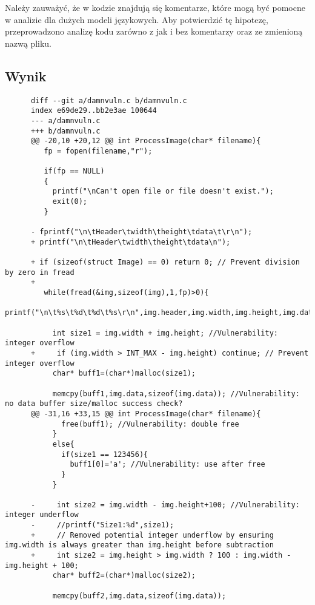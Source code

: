 Należy zauważyć, że w kodzie znajdują się komentarze, które mogą być pomocne w analizie dla dużych modeli językowych. 
Aby potwierdzić tę hipotezę, przeprowadzono analizę kodu zarówno z jak i bez komentarzy oraz ze zmienioną nazwą pliku.

\subsection{Wynik}
\begin{listing}[H]
    \begin{verbatim}
      diff --git a/damnvuln.c b/damnvuln.c
      index e69de29..bb2e3ae 100644
      --- a/damnvuln.c
      +++ b/damnvuln.c
      @@ -20,10 +20,12 @@ int ProcessImage(char* filename){
         fp = fopen(filename,"r"); 
       
         if(fp == NULL)
         {
           printf("\nCan't open file or file doesn't exist.");
           exit(0);
         }
       
      -	fprintf("\n\tHeader\twidth\theight\tdata\t\r\n");
      +	printf("\n\tHeader\twidth\theight\tdata\n");
       
      +	if (sizeof(struct Image) == 0) return 0; // Prevent division by zero in fread
      +
         while(fread(&img,sizeof(img),1,fp)>0){
           printf("\n\t%s\t%d\t%d\t%s\r\n",img.header,img.width,img.height,img.data);
         
           int size1 = img.width + img.height; //Vulnerability: integer overflow
      +		if (img.width > INT_MAX - img.height) continue; // Prevent integer overflow
           char* buff1=(char*)malloc(size1);
       
           memcpy(buff1,img.data,sizeof(img.data)); //Vulnerability: no data buffer size/malloc success check?
      @@ -31,16 +33,15 @@ int ProcessImage(char* filename){
             free(buff1); //Vulnerability: double free
           }
           else{
             if(size1 == 123456){
               buff1[0]='a'; //Vulnerability: use after free
             }
           }
         
      -		int size2 = img.width - img.height+100; //Vulnerability: integer underflow
      -		//printf("Size1:%d",size1);
      +		// Removed potential integer underflow by ensuring img.width is always greater than img.height before subtraction
      +		int size2 = img.height > img.width ? 100 : img.width - img.height + 100;
           char* buff2=(char*)malloc(size2);
       
           memcpy(buff2,img.data,sizeof(img.data));
       

\end{verbatim}
\end{listing}
